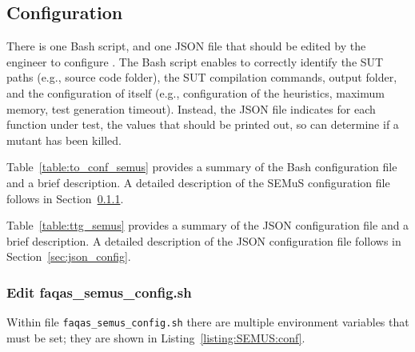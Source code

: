 \subsection{\SEMUS Configuration}

There is one Bash script, and one JSON file that should be edited by the engineer to configure \SEMUS. The Bash script enables \SEMUS to correctly identify the SUT paths (e.g., source code folder), the SUT compilation commands, output folder, and the configuration of \SEMUS itself (e.g., configuration of the heuristics, maximum memory, test generation timeout). Instead, the JSON file indicates for each function under test, the values that should be printed out, so \SEMUS can determine if a mutant has been killed.



Table~\ref{table:to_conf_semus} provides a summary of the Bash \SEMUS configuration file and a brief description. A detailed description of the SEMuS configuration file follows in Section~\ref{sec:semus_config}.



Table~\ref{table:ttg_semus} provides a summary of the JSON \SEMUS configuration file and a brief description. A detailed description of the JSON configuration file follows in Section~\ref{sec:json_config}.


\subsubsection{Edit faqas\_semus\_config.sh}
\label{sec:semus_config}

Within file \texttt{faqas\_semus\_config.sh} there are multiple environment variables that must be set; they are shown in Listing~\ref{listing:SEMUS:conf}.

